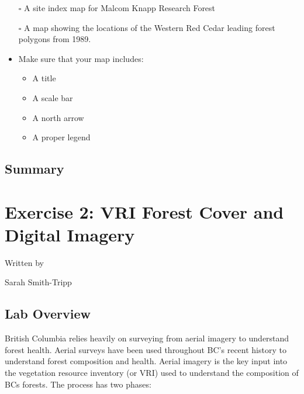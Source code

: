 \documentclass[
  letterpaper,
]{book}
\providecommand{\tightlist}{%
  \setlength{\itemsep}{0pt}\setlength{\parskip}{0pt}}\usepackage{longtable,booktabs,array}
\begin{document}
\begin{itemize}
  \begin{itemize}
  \tightlist
  \item[$\square$]
    A site index map for Malcom Knapp Research Forest
  \item[$\square$]
    A map showing the locations of the Western Red Cedar leading forest
    polygons from 1989.
  \item
    Make sure that your map includes:

    \begin{itemize}
    \tightlist
    \item
      A title
    \item
      A scale bar
    \item
      A north arrow
    \item
      A proper legend
    \end{itemize}
  \end{itemize}
\end{itemize}

\hypertarget{summary}{%
\section*{Summary}\label{summary}}



\hypertarget{terrain-spatial-interpolation}{%
\chapter{Exercise 2: VRI Forest Cover and Digital
Imagery}\label{terrain-spatial-interpolation}}

Written by

Sarah Smith-Tripp

\hypertarget{lab-overview-1}{%
\section*{Lab Overview}\label{lab-overview-1}}


British Columbia relies heavily on surveying from aerial imagery to
understand forest health. Aerial surveys have been used throughout BC's
recent history to understand forest composition and health. Aerial
imagery is the key input into the vegetation resource inventory (or VRI)
used to understand the composition of BCs forests. The process has two
phases:
\end{document}
